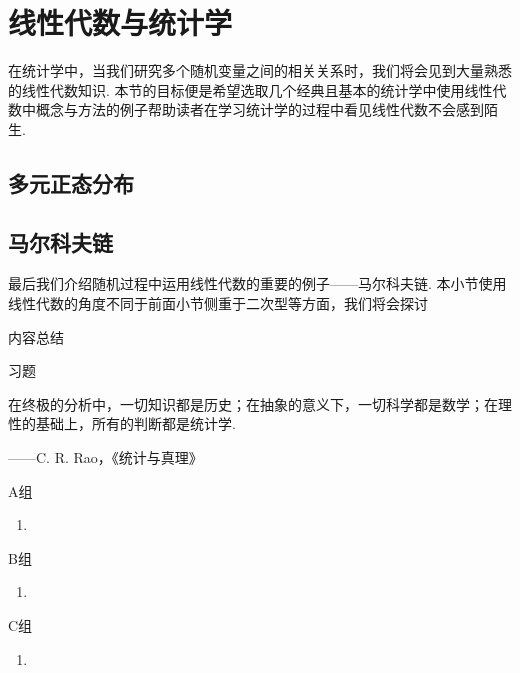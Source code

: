 \chapter{线性代数与统计学}

在统计学中，当我们研究多个随机变量之间的相关关系时，我们将会见到大量熟悉的线性代数知识. 本节的目标便是希望选取几个经典且基本的统计学中使用线性代数中概念与方法的例子帮助读者在学习统计学的过程中看见线性代数不会感到陌生.

\section{多元正态分布}

\section{马尔科夫链}

最后我们介绍随机过程中运用线性代数的重要的例子——马尔科夫链. 本小节使用线性代数的角度不同于前面小节侧重于二次型等方面，我们将会探讨

\vspace{2ex}
\centerline{\heiti \Large 内容总结}

\vspace{2ex}
\centerline{\heiti \Large 习题}

\vspace{2ex}
{\kaishu 在终极的分析中，一切知识都是历史；在抽象的意义下，一切科学都是数学；在理性的基础上，所有的判断都是统计学.}
\begin{flushright}
    \kaishu
    ——C. R. Rao，《统计与真理》
\end{flushright}

\centerline{\heiti A组}
\begin{enumerate}
    \item
\end{enumerate}

\centerline{\heiti B组}
\begin{enumerate}
    \item
\end{enumerate}

\centerline{\heiti C组}
\begin{enumerate}
    \item
\end{enumerate}
